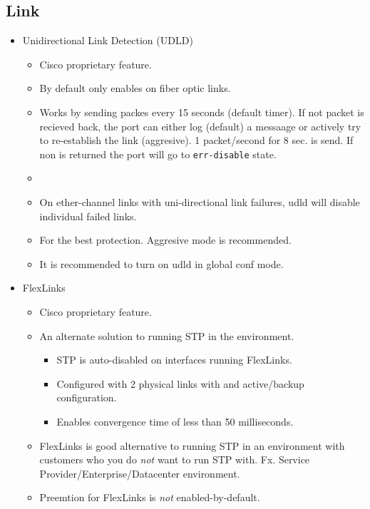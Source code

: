 \subsection{Link}

\begin{itemize}
    \item Unidirectional Link Detection (UDLD)
    \begin{itemize}
        \item Cisco proprietary feature.
        \item By default only enables on fiber optic links.
        \item Works by sending packes every 15 seconds (default timer). If not packet is recieved back, the port can either log (default) a messaage or actively try to re-establish the link (aggresive). 1 packet/second for 8 sec. is send. If non is returned the port will go to \texttt{err-disable} state.
        \item {}
        \item On ether-channel links with uni-directional link failures, udld will disable individual failed links.
        \item For the best protection. Aggresive mode is recommended.
        \item It is recommended to turn on udld in global conf mode.
    \end{itemize}
    \item FlexLinks
    \begin{itemize}
        \item Cisco proprietary feature.
        \item An alternate solution to running STP in the environment.
        \begin{itemize}
            \item STP is auto-disabled on interfaces running FlexLinks.
            \item Configured with 2 physical links with and active/backup configuration.
            \item Enables convergence time of less than 50 milliseconds.
        \end{itemize}
        \item FlexLinks is good alternative to running STP in an environment with customers who you do \textit{not} want to run STP with. Fx. Service Provider/Enterprise/Datacenter environment.
        \item Preemtion for FlexLinks is \textit{not} enabled-by-default.

\end{itemize}
\end{itemize}
